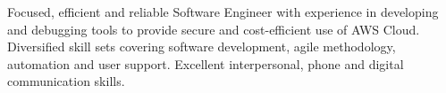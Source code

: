 

\begin{cvparagraph}

Focused, efficient and reliable Software Engineer with experience in developing and debugging tools to provide secure and cost-efficient use of AWS Cloud. Diversified skill sets covering software development, agile methodology, automation and user support. Excellent interpersonal, phone and digital communication skills. 
\end{cvparagraph}
